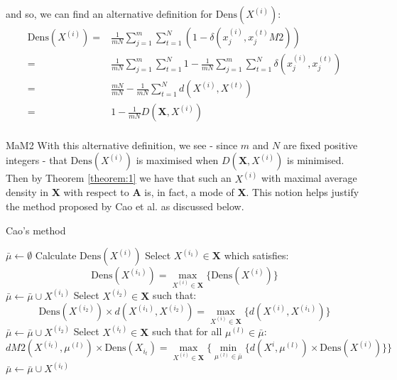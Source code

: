\documentclass{article}
\theoremstyle{definition}
\begin{document}
and so, we can find an alternative definition for $\text{Dens}(X^{(i)})$:
\begin{equation}
\begin{aligned}
    \text{Dens}(X^{(i)}) = {} & {} \frac{1}{mN} \sum_{j=1}^m \sum_{t=1}^N 
                         (1 - \delta(x_j^{(i)}, x_j^{(t)}M2))
    \\
			             = {} & {} \frac{1}{mN} \sum_{j=1}^m \sum_{t=1}^N 1 - 
                         \frac{1}{mN} \sum_{j=1}^m \sum_{t=1}^N 
                         \delta(x_j^{(i)}, x_j^{(t)})
    \\
                         = {} & {} \frac{mN}{mN} - \frac{1}{mN} \sum_{t=1}^N 
                         d(X^{(i)}, X^{(t)})
    \\
			             = {} & {} 1 - \frac{1}{mN} D(\textbf{X}, X^{(i)})
\end{aligned}
\end{equation}\\
MaM2
With this alternative definition, we see - since \(m\) and \(N\) are fixed 
positive integers - that \(\text{Dens}(X^{(i)})\) is maximised when 
\(D(\textbf{X}, X^{(i)})\) is minimised. Then by Theorem \ref{theorem:1} we have
that such an \(X^{(i)}\) with maximal average density in \textbf{X} with respect
to \textbf{A} is, in fact, a mode of \textbf{X}. This notion helps justify the 
method proposed by Cao et al. as discussed below.\\

\begin{algorithm}[H]
\caption{Cao's method}\label{alg:cao}
	\begin{algorithmic}[0]
        \State \(\bar{\mu} \gets \emptyset\)
            \State Calculate \(\text{Dens}(X^{(i)})\)
		\EndFor
        \State Select \(X^{(i_1)} \in \textbf{X}\) which satisfies:
        \[
            \text{Dens}(X^{(i_1)}) = \max_{X^{(i)} \in \textbf{X}} 
            \{\text{Dens}(X^{(i)})\}
        \]
        \State \(\bar{\mu} \gets \bar{\mu} \cup X^{(i_1)}\)
        \State Select \(X^{(i_2)} \in \textbf{X}\) such that: 
        \[
			\text{Dens}(X^{(i_2)}) \times d(X^{(i_1)}, X^{(i_2)}) =
			\max_{X^{(i)} \in \textbf{X}} \{d(X^{(i)}, X^{(i_1)})\}
		\]
        \State \(\bar{\mu} \gets \bar{\mu} \cup X^{(i_2)}\)
            \State Select \(X^{(i_t)} \in \textbf{X}\) such that for all 
                \(\mu^{(l)} \in \bar{\mu}\):
			\[
		        dM2(X^{(i_t)}, \mu^{(l)}) \times \text{Dens}(X_{i_t}) = 
                \max_{X^{(i)} \in \textbf{X}} \{\min_{\mu^{(l)} \in \bar{\mu}} 
				\{d(X^{i}, \mu^{(l)}) \times \text{Dens}(X^{(i)}) \}\}
			\]
            \State \(\bar{\mu} \gets \bar{\mu} \cup X^{(i_t)}\)
		\EndWhile
	\end{algorithmic}
\end{algorithm}
\end{document}
